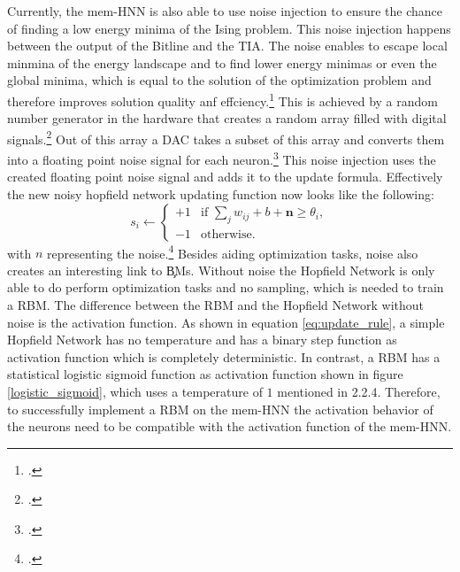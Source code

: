 Currently, the \ac{mem-HNN} is also able to use noise injection to ensure the chance of finding a low energy minima of the Ising problem.
This noise injection happens between the output of the Bitline and the \ac{TIA}. 
The noise enables to escape local minmina of the energy landscape and to find lower energy minimas or even the global minima, which is equal to the solution of the optimization problem and therefore improves solution quality anf effciency.\footcite[cf.][410]{caiPowerefficientCombinatorialOptimization2020} 
This is achieved by a random number generator in the hardware that creates a random array filled with digital signals.\footcite[cf.][22]{caiHarnessingIntrinsicNoise2019}
Out of this array a \ac{DAC} takes a subset of this array and converts them into a floating point noise signal for each neuron.\footcite[cf.][3]{hizzaniMemristorbasedHardwareAlgorithms2023}
This noise injection uses the created floating point noise signal and adds it to the update formula.
Effectively the new noisy hopfield network updating function now looks like the following: 
\begin{equation}
    s_i \leftarrow 
    \begin{cases} 
    +1 & \text{if } \sum_j w_{ij}  + b + \mathbf{n} \geq \theta_i, \\
    -1 & \text{otherwise}.
    \end{cases}
    \label{noisy_update_HNN_formula}
\end{equation}
with \(n\) representing the noise.\footcite[cf.][410]{caiPowerefficientCombinatorialOptimization2020} 
Besides aiding optimization tasks, noise also creates an interesting link to \c{BM}s.
Without noise the Hopfield Network is only able to do perform optimization tasks and no sampling, which is needed to train a \ac{RBM}.
The difference between the \ac{RBM} and the Hopfield Network without noise is the activation function.
As shown in equation \ref{eq:update_rule}, a simple Hopfield Network has no temperature and has a binary step function as activation function which is completely deterministic.
In contrast, a \ac{RBM} has a statistical logistic sigmoid function as activation function shown in figure \ref{logistic_sigmoid}, which uses a temperature of \(1\) mentioned in 2.2.4.
Therefore, to successfully implement a \ac{RBM} on the \ac{mem-HNN} the activation behavior of the neurons need to be compatible with the activation function of the \ac{mem-HNN}.

